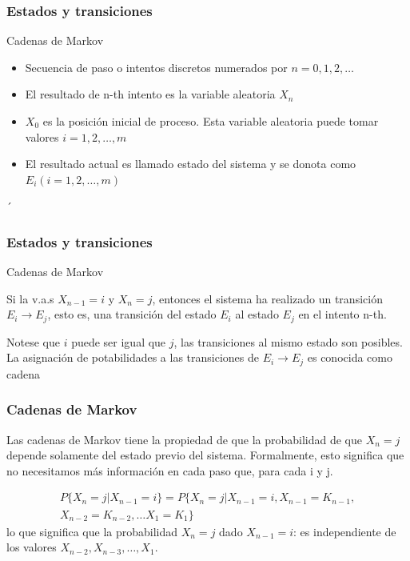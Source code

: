 \documentclass[spanish]{beamer}
\begin{document}
\begin{frame}
\frametitle{Estados y transiciones} 
Cadenas de Markov
\begin{itemize}
\item Secuencia de paso o intentos discretos numerados por $n=0,1,2,\ldots$
\item El resultado de n-th intento es la variable aleatoria $X_{n}$
\item $X_{0}$ es la posición inicial de proceso. Esta variable aleatoria puede tomar valores $i=1,2,\ldots, m$ 
\item El resultado actual es llamado estado del sistema y se donota como $E_{i} (i=1,2,\ldots, m)$
\end{itemize}
´\end{frame}
\begin{frame}
\frametitle{Estados y transiciones}
Cadenas de Markov

Si la v.a.s $X_{n-1} = i$ y $X_{n} = j$, entonces el sistema ha realizado un transición $E_{i} \rightarrow E_{j} $, esto es, una transición del estado $E_{i}$ al estado $E_{j}$ en el intento n-th.

Notese que $i$ puede ser igual que $j$, las transiciones al mismo estado son posibles.
La asignación de potabilidades a las transiciones de $E_{i} \rightarrow E_{j}$ es conocida como cadena

\end{frame}
\begin{frame}
\frametitle{Cadenas de Markov}
Las cadenas de Markov tiene la propiedad de que la probabilidad de que $X_{n}=j$ depende solamente del estado previo del sistema.  Formalmente, esto significa que no necesitamos más información en cada paso que, para cada i y j.


\begin{multline*}
P\lbrace X_{n} = j\vert X_{n-1} = i\rbrace = P\lbrace X_{n} = j\vert X_{n-1} = i, X_{n-1} = K_{n-1},\\ X_{n-2} =  K_{n-2}, \ldots X_{1} = K_{1} \rbrace
\end{multline*}
lo que  significa que la probabilidad $X_{n} = j$ dado $X_{n-1} = i$: es independiente de los valores $X_{n-2} , X_{n-3},  \ldots, X_{1}$. 
\end{frame}
\end{document}
